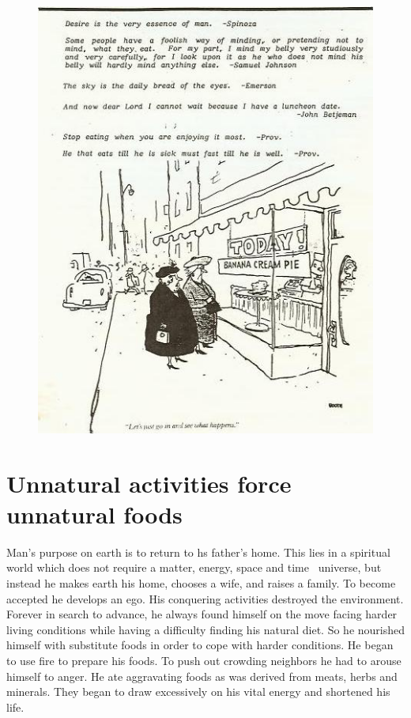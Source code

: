 \documentclass[landscape,twocolumn,letterpaper]{article}
\newcommand{\mest}{matter, energy, space and time }
\begin{document}
\begin{figure} \centering
  \includegraphics[height=0.8\textheight,bb=0 0 439 559]{p14.jpg}
\end{figure}

\section{Unnatural activities force unnatural foods}

Man's purpose on earth is to return to hs father's home. This lies in
a spiritual world which does not require a \mest\  universe, but instead
he makes earth his home, chooses a wife, and raises a family. To
become accepted he develops an ego. His conquering activities
destroyed the environment. Forever in search to advance, he always
found himself on the move facing harder living conditions while having
a difficulty finding his natural diet. So he nourished himself with
substitute foods in order to cope with harder conditions. He began to
use fire to prepare his foods. To push out crowding neighbors he had
to arouse himself to anger. He ate aggravating foods as was derived
from meats, herbs and minerals. They began to draw excessively on his
vital energy and shortened his life.
\end{document}
